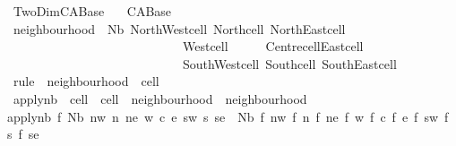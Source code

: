 %
\begin{isabellebody}%
%
%
\isadelimdocument
%
\endisadelimdocument
%
\isatagdocument
%
\isamarkuptrue%
%
\endisatagdocument
{\isafolddocument}%
%
\isadelimdocument
%
\endisadelimdocument
%
\isadelimtheory
%
\endisadelimtheory
%
\isatagtheory
{}\isamarkupfalse%
\ TwoDim{\isacharunderscore}CA{\isacharunderscore}Base\isanewline
\ \ \ CA{\isacharunderscore}Base\isanewline
{}%
\endisatagtheory
{\isafoldtheory}%
%
\isadelimtheory
\isanewline
%
\endisadelimtheory
\isanewline
{}\isamarkupfalse%
\ neighbourhood\ {\isacharequal}\ Nb\ {\isacharparenleft}NorthWest{\isacharcolon}cell{\isacharparenright}\ {\isacharparenleft}North{\isacharcolon}cell{\isacharparenright}\ {\isacharparenleft}NorthEast{\isacharcolon}cell{\isacharparenright}\isanewline
\ \ \ \ \ \ \ \ \ \ \ \ \ \ \ \ \ \ \ \ \ \ \ \ \ \ \ \ {\isacharparenleft}West{\isacharcolon}cell{\isacharparenright}\ \ \ \ \ \ {\isacharparenleft}Centre{\isacharcolon}cell{\isacharparenright}{\isacharparenleft}East{\isacharcolon}cell{\isacharparenright}\isanewline
\ \ \ \ \ \ \ \ \ \ \ \ \ \ \ \ \ \ \ \ \ \ \ \ \ \ \ \ {\isacharparenleft}SouthWest{\isacharcolon}cell{\isacharparenright}\ {\isacharparenleft}South{\isacharcolon}cell{\isacharparenright}\ {\isacharparenleft}SouthEast{\isacharcolon}cell{\isacharparenright}\isanewline
\isanewline
{}\isamarkupfalse%
\ rule\ {\isacharequal}\ {\isachardoublequoteopen}neighbourhood\ {\isasymRightarrow}\ cell{\isachardoublequoteclose}\isanewline
\isanewline
{}\isamarkupfalse%
\ apply{\isacharunderscore}nb\ {\isacharcolon}{\isacharcolon}\ {\isachardoublequoteopen}{\isacharparenleft}cell\ {\isasymRightarrow}\ cell{\isacharparenright}\ {\isasymRightarrow}\ neighbourhood\ {\isasymRightarrow}\ neighbourhood{\isachardoublequoteclose}\ \isanewline
{\isachardoublequoteopen}apply{\isacharunderscore}nb\ f\ {\isacharparenleft}Nb\ nw\ n\ ne\ w\ c\ e\ sw\ s\ se{\isacharparenright}\ {\isacharequal}\ Nb\ {\isacharparenleft}f\ nw{\isacharparenright}\ {\isacharparenleft}f\ n{\isacharparenright}\ {\isacharparenleft}f\ ne{\isacharparenright}\ {\isacharparenleft}f\ w{\isacharparenright}\ {\isacharparenleft}f\ c{\isacharparenright}\ {\isacharparenleft}f\ e{\isacharparenright}\ {\isacharparenleft}f\ sw{\isacharparenright}\ {\isacharparenleft}f\ s{\isacharparenright}\ {\isacharparenleft}f\ se{\isacharparenright}{\isachardoublequoteclose}\isanewline

\end{isabellebody}
